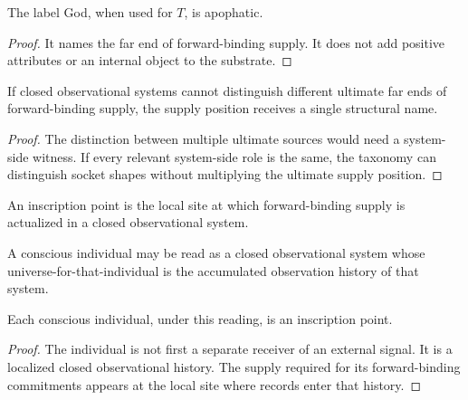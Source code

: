 \begin{corollary}
\label{cor:philosophy-god-apophatic-label}
The label God, when used for \(T\), is apophatic.
\end{corollary}
\begin{proof}
It names the far end of forward-binding supply. It does not add
positive attributes or an internal object to the substrate.
\end{proof}

\begin{corollary}
\label{cor:philosophy-structural-monotheism}
If closed observational systems cannot distinguish different ultimate
far ends of forward-binding supply, the supply position receives a
single structural name.
\end{corollary}
\begin{proof}
The distinction between multiple ultimate sources would need a
system-side witness. If every relevant system-side role is the same,
the taxonomy can distinguish socket shapes without multiplying the
ultimate supply position.
\end{proof}

\begin{definition}
\label{def:philosophy-inscription-point}
An inscription point is the local site at which forward-binding supply
is actualized in a closed observational system.
\end{definition}

\begin{definition}
\label{def:philosophy-individual-closed-observational-system}
A conscious individual may be read as a closed observational system
whose universe-for-that-individual is the accumulated observation
history of that system.
\end{definition}

\begin{theorem}
\label{thm:philosophy-individuals-inscription-points}
Each conscious individual, under this reading, is an inscription point.
\end{theorem}
\begin{proof}
The individual is not first a separate receiver of an external signal.
It is a localized closed observational history. The supply required for
its forward-binding commitments appears at the local site where records
enter that history.
\end{proof}

